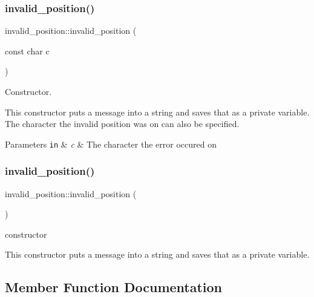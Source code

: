 \subsubsection{\texorpdfstring{invalid\+\_\+position()}{invalid\_position()}\hspace{0.1cm}{\footnotesize\ttfamily [1/2]}}
{\footnotesize\ttfamily invalid\+\_\+position\+::invalid\+\_\+position (\begin{DoxyParamCaption}\item[{const char}]{c }\end{DoxyParamCaption})\hspace{0.3cm}{\ttfamily [inline]}}



Constructor. 

This constructor puts a message into a string and saves that as a private variable. The character the invalid position was on can also be specified.


\begin{DoxyParams}[1]{Parameters}
\mbox{\tt in}  & {\em c} & The character the error occured on \\
\hline
\end{DoxyParams}
\mbox{\label{classinvalid__position_aabeae0fae84fada6af68ff83a68c6542}} 
\subsubsection{\texorpdfstring{invalid\+\_\+position()}{invalid\_position()}\hspace{0.1cm}{\footnotesize\ttfamily [2/2]}}
{\footnotesize\ttfamily invalid\+\_\+position\+::invalid\+\_\+position (\begin{DoxyParamCaption}{ }\end{DoxyParamCaption})\hspace{0.3cm}{\ttfamily [inline]}}



constructor 

This constructor puts a message into a string and saves that as a private variable. 

\subsection{Member Function Documentation}
\mbox{\label{classinvalid__position_a7de16130368fed8546deef6713025cfa}} 
